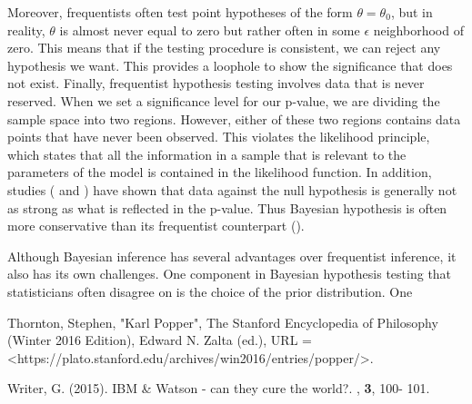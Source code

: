 \message{ !name(biostat830_literatureReview.tex)}\documentclass[12pt]{article} \usepackage[nolists]{endfloat}
\begin{document}
Moreover, frequentists often test point hypotheses of the form
$\theta = \theta_0$, but in reality, $\theta$ is almost never equal to
zero but rather often in some $\epsilon$ neighborhood of zero.  This
means that if the testing procedure is consistent, we can reject any
hypothesis we want.  This provides a loophole to show the significance
that does not exist.  Finally, frequentist hypothesis testing involves
data that is never reserved.  When we set a significance level for our
p-value, we are dividing the sample space into two regions.  However,
either of these two regions contains data points that have never been
observed.  This violates the likelihood principle, which states that
all the information in a sample that is relevant to the parameters of
the model is contained in the likelihood function. In addition,
studies (\cite{bergerSelke} and \cite{casellaBerger}) have shown that
data against the null hypothesis is generally not as strong as what is
reflected in the p-value. Thus Bayesian hypothesis is often more
conservative than its frequentist counterpart (\cite{press}).

Although Bayesian inference has several advantages over frequentist
inference, it also has its own challenges.  One component in Bayesian
hypothesis testing that statisticians often disagree on is the choice
of the prior distribution.  One



\vspace{0.5in}

\begin{thebibliography}{}


  



 \newblock Thornton, Stephen, "Karl
  Popper", The Stanford Encyclopedia of Philosophy (Winter 2016
  Edition), Edward N. Zalta (ed.), URL =
  <https://plato.stanford.edu/archives/win2016/entries/popper/>.

 Writer, G. (2015).  \newblock IBM \&
  Watson - can they cure the world?.  , {\bf 3}, 100- 101.
\end{thebibliography}

\end{document}
